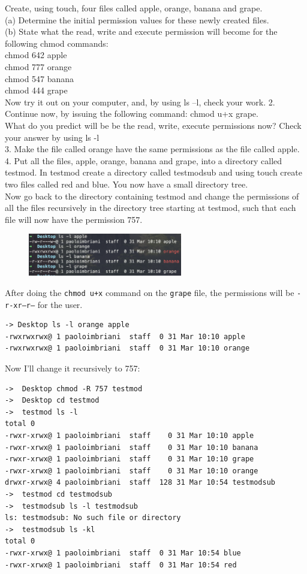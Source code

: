 \documentclass[a4paper]{article}
\begin{document}
\textcolor{green!50!black}
{
Create, using touch, four files called apple, orange, banana and grape.\\
(a) Determine the initial permission values for these newly created files.\\
(b) State what the read, write and execute permission will become for the following
chmod commands:\\
chmod 642 apple\\
chmod 777 orange\\
chmod 547 banana\\
chmod 444 grape\\
Now try it out on your computer, and, by using ls –l, check your work.
2. Continue now, by issuing the following command: chmod u+x grape.\\
What do you predict will be be the read, write, execute permissions now? Check your
answer by using ls -l\\
3. Make the file called orange have the same permissions as the file called apple.\\
4. Put all the files, apple, orange, banana and grape, into a directory called testmod.
In testmod create a directory called testmodsub and using touch create two files called
red and blue. You now have a small directory tree.\\
Now go back to the directory containing testmod and change the permissions of all the
files recursively in the directory tree starting at testmod, such that each file will now
have the permission 757.
}

\begin{figure}[H]
    \centering
    \includegraphics[width=0.6\textwidth]{pract6ex1.png}
\end{figure}
\noindent
After doing the \texttt{chmod u+x} command on the \texttt{grape} file, the permissions will be \texttt{-r-xr--r--} for the user.\\

\begin{verbatim}
-> Desktop ls -l orange apple
-rwxrwxrwx@ 1 paoloimbriani  staff  0 31 Mar 10:10 apple
-rwxrwxrwx@ 1 paoloimbriani  staff  0 31 Mar 10:10 orange
\end{verbatim}
\noindent
Now I'll change it recursively to 757:

\begin{verbatim}
->  Desktop chmod -R 757 testmod
->  Desktop cd testmod
->  testmod ls -l
total 0
-rwxr-xrwx@ 1 paoloimbriani  staff    0 31 Mar 10:10 apple
-rwxr-xrwx@ 1 paoloimbriani  staff    0 31 Mar 10:10 banana
-rwxr-xrwx@ 1 paoloimbriani  staff    0 31 Mar 10:10 grape
-rwxr-xrwx@ 1 paoloimbriani  staff    0 31 Mar 10:10 orange
drwxr-xrwx@ 4 paoloimbriani  staff  128 31 Mar 10:54 testmodsub
->  testmod cd testmodsub 
->  testmodsub ls -l testmodsub
ls: testmodsub: No such file or directory
->  testmodsub ls -kl
total 0
-rwxr-xrwx@ 1 paoloimbriani  staff  0 31 Mar 10:54 blue
-rwxr-xrwx@ 1 paoloimbriani  staff  0 31 Mar 10:54 red
\end{verbatim}
\end{document}
